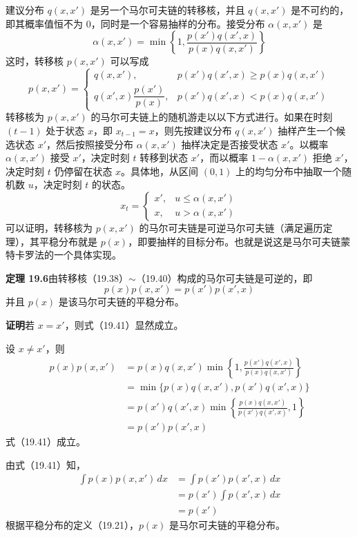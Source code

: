 \documentclass[UTF8,12pt,a4paper,fontset=fandol]{ctexart}
\begin{document}
建议分布 $q(x,x')$ 是另一个马尔可夫链的转移核，并且 $q(x,x')$ 是不可约的，即其概率值恒不为 0，同时是一个容易抽样的分布。接受分布 $\alpha(x,x')$ 是
\begin{equation}
\alpha(x,x')=\min\left\{1,\frac{p(x')q(x',x)}{p(x)q(x,x')}\right\}
\tag{19.39}
\end{equation}
这时，转移核 $p(x,x')$ 可以写成
\begin{equation}
p(x,x')=
\begin{cases}
q(x,x'), & p(x')q(x',x)\geqslant p(x)q(x,x')\\
q(x',x)\dfrac{p(x')}{p(x)}, & p(x')q(x',x)<p(x)q(x,x')
\end{cases}
\tag{19.40}
\end{equation}
转移核为 $p(x,x')$ 的马尔可夫链上的随机游走以以下方式进行。如果在时刻
$(t-1)$ 处于状态 $x$，即 $x_{t-1}=x$，则先按建议分布 $q(x,x')$ 抽样产生一个候选状态 $x'$，然后按照接受分布 $\alpha(x,x')$ 抽样决定是否接受状态 $x'$。以概率 $\alpha(x,x')$ 接受 $x'$，决定时刻 $t$ 转移到状态 $x'$，而以概率 $1-\alpha(x,x')$ 拒绝 $x'$，决定时刻 $t$ 仍停留在状态 $x$。具体地，从区间 $(0,1)$ 上的均匀分布中抽取一个随机数 $u$，决定时刻 $t$ 的状态。
\[
x_t=
\begin{cases}
x', & u\leqslant \alpha(x,x')\\
x, & u>\alpha(x,x')
\end{cases}
\]
可以证明，转移核为 $p(x,x')$ 的马尔可夫链是可逆马尔可夫链（满足遍历定理），其平稳分布就是 $p(x)$，即要抽样的目标分布。也就是说这是马尔可夫链蒙特卡罗法的一个具体实现。

\noindent\textbf{定理 19.6}\quad 由转移核（19.38）$\sim$（19.40）构成的马尔可夫链是可逆的，即
\begin{equation}
p(x)p(x,x')=p(x')p(x',x)
\tag{19.41}
\end{equation}
并且 $p(x)$ 是该马尔可夫链的平稳分布。

\noindent\textbf{证明}\quad 若 $x=x'$，则式（19.41）显然成立。

设 $x\neq x'$，则
\[
\begin{aligned}
p(x)p(x,x')
&=p(x)q(x,x')\min\left\{1,\frac{p(x')q(x',x)}{p(x)q(x,x')}\right\}\\
&=\min\{p(x)q(x,x'),p(x')q(x',x)\}\\
&=p(x')q(x',x)\min\left\{\frac{p(x)q(x,x')}{p(x')q(x',x)},1\right\}\\
&=p(x')p(x',x)
\end{aligned}
\]
式（19.41）成立。

由式（19.41）知，
\[
\begin{aligned}
\int p(x)p(x,x')\,dx
&=\int p(x')p(x',x)\,dx\\
&=p(x')\int p(x',x)\,dx\\
&=p(x')
\end{aligned}
\]
根据平稳分布的定义（19.21），$p(x)$ 是马尔可夫链的平稳分布。
\end{document}
